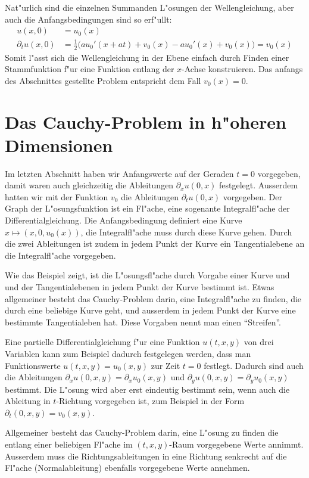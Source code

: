 Nat"urlich sind die einzelnen Summanden L"osungen der Wellengleichung, aber auch
die Anfangsbedingungen sind so erf"ullt:
\begin{align*}
u(x,0)&=u_0(x)\\
\partial_tu(x,0)&=\frac12\bigl(au_0'(x+at)+v_0(x)-au_0'(x)+v_0(x)\bigr) =v_0(x)
\end{align*}
Somit l"asst sich die Wellengleichung in der Ebene einfach durch Finden einer
Stammfunktion f"ur eine Funktion entlang der $x$-Achse konstruieren.
Das anfangs des Abschnittes
gestellte Problem entspricht dem Fall $v_0(x)=0$.

\section{Das Cauchy-Problem in h"oheren Dimensionen}
Im letzten Abschnitt haben wir Anfangswerte auf der Geraden $t=0$
vorgegeben, damit waren auch gleichzeitig die Ableitungen 
$\partial_x u(0,x)$ festgelegt. Ausserdem hatten wir mit der Funktion $v_0$
die Ableitungen $\partial_t u(0,x)$ vorgegeben.
Der Graph der L"osungsfunktion ist ein Fl"ache, eine sogenante
Integralfl"ache der Differentialgleichung. Die Anfangsbedingung
definiert eine Kurve $x\mapsto(x,0,u_0(x))$, die Integralfl"ache muss
durch diese Kurve gehen.
Durch die zwei Ableitungen ist zudem in jedem Punkt der Kurve ein Tangentialebene
an die Integralfl"ache vorgegeben.

Wie das Beispiel zeigt, ist die L"osungsfl"ache durch Vorgabe einer Kurve und
und der Tangentialebenen in jedem Punkt der Kurve bestimmt ist.
Etwas allgemeiner besteht das Cauchy-Problem darin, eine Integralfl"ache
zu finden, die durch eine beliebige Kurve geht, und ausserdem in jedem Punkt
der Kurve eine bestimmte Tangentialeben hat. Diese Vorgaben nennt man
einen ``Streifen''.

Eine partielle Differentialgleichung f"ur eine Funktion $u(t,x,y)$
von drei Variablen kann zum Beispiel dadurch festgelegen werden,
dass man Funktionswerte $u(t,x,y)=u_0(x,y)$ zur Zeit $t=0$ festlegt.
Dadurch sind auch die Ableitungen $\partial_x u(0,x,y)=\partial_xu_0(x,y)$
und $\partial_y u(0,x,y)=\partial_y u_0(x,y)$ bestimmt. Die L"osung wird
aber erst eindeutig bestimmt sein, wenn auch die Ableitung in $t$-Richtung
vorgegeben ist, zum Beispiel in der Form $\partial_t(0,x,y)=v_0(x,y)$.

Allgemeiner besteht das Cauchy-Problem darin, eine L"osung zu finden
die entlang einer beliebigen Fl"ache im $(t,x,y)$-Raum vorgegebene
Werte annimmt. Ausserdem muss die Richtungsableitungen in eine Richtung
senkrecht auf die Fl"ache (Normalableitung) ebenfalls vorgegebene Werte annehmen.


